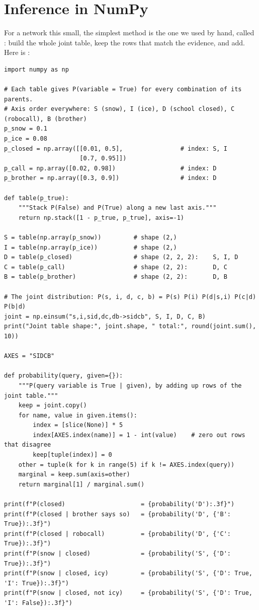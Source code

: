 \section{Inference in NumPy}
For a network this small, the simplest method is the one we used by hand, called : build the whole joint table, keep the rows that match the
evidence, and add. Here is :

\begin{verbatim}
import numpy as np

# Each table gives P(variable = True) for every combination of its parents.
# Axis order everywhere: S (snow), I (ice), D (school closed), C (robocall), B (brother)
p_snow = 0.1
p_ice = 0.08
p_closed = np.array([[0.01, 0.5],                # index: S, I
                     [0.7, 0.95]])
p_call = np.array([0.02, 0.98])                  # index: D
p_brother = np.array([0.3, 0.9])                 # index: D

def table(p_true):
    """Stack P(False) and P(True) along a new last axis."""
    return np.stack([1 - p_true, p_true], axis=-1)

S = table(np.array(p_snow))         # shape (2,)
I = table(np.array(p_ice))          # shape (2,)
D = table(p_closed)                 # shape (2, 2, 2):    S, I, D
C = table(p_call)                   # shape (2, 2):       D, C
B = table(p_brother)                # shape (2, 2):       D, B

# The joint distribution: P(s, i, d, c, b) = P(s) P(i) P(d|s,i) P(c|d) P(b|d)
joint = np.einsum("s,i,sid,dc,db->sidcb", S, I, D, C, B)
print("Joint table shape:", joint.shape, " total:", round(joint.sum(), 10))

AXES = "SIDCB"

def probability(query, given={}):
    """P(query variable is True | given), by adding up rows of the joint table."""
    keep = joint.copy()
    for name, value in given.items():
        index = [slice(None)] * 5
        index[AXES.index(name)] = 1 - int(value)    # zero out rows that disagree
        keep[tuple(index)] = 0
    other = tuple(k for k in range(5) if k != AXES.index(query))
    marginal = keep.sum(axis=other)
    return marginal[1] / marginal.sum()

print(f"P(closed)                     = {probability('D'):.3f}")
print(f"P(closed | brother says so)   = {probability('D', {'B': True}):.3f}")
print(f"P(closed | robocall)          = {probability('D', {'C': True}):.3f}")
print(f"P(snow | closed)              = {probability('S', {'D': True}):.3f}")
print(f"P(snow | closed, icy)         = {probability('S', {'D': True, 'I': True}):.3f}")
print(f"P(snow | closed, not icy)     = {probability('S', {'D': True, 'I': False}):.3f}")
\end{verbatim}

